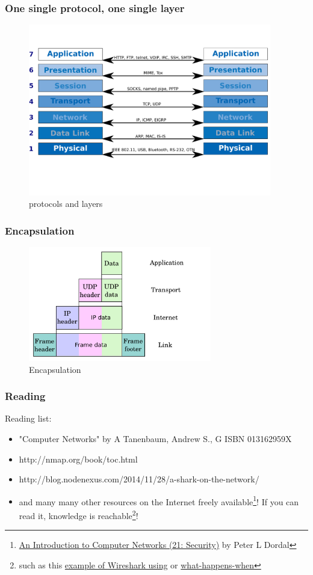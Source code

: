   \begin{frame}
    \frametitle{One single protocol, one single layer}
    \begin{figure}[t]
      \centering
      \includegraphics[height=7.5cm]{./imgs/layer2protocol.pdf}
      \caption{protocols and layers}
      \label{fig:layers2proto}
    \end{figure}
  \end{frame}
  \begin{frame}
    \frametitle{Encapsulation}
    \begin{figure}[t]
      \centering
      \includegraphics[height=5cm]{./imgs/encapsulation.pdf}
      \caption{Encapsulation}
      \label{fig:encapsulation}
    \end{figure}
  \end{frame}

  \begin{frame}
    \frametitle{Reading}
    \begin{block}{Reading list:}
      \begin{itemize}
        \item "Computer Networks" by A Tanenbaum, Andrew S., G ISBN 013162959X
        \item http://nmap.org/book/toc.html
        \item http://blog.nodenexus.com/2014/11/28/a-shark-on-the-network/
        \item and many many other resources on the Internet freely available\footnote{{\color{blue}\href{http://intronetworks.cs.luc.edu/current/ComputerNetworks.pdf}{An Introduction to Computer Networks (21: Security)}} by Peter L Dordal}! If you can read it, knowledge is reachable\footnote{such as this {\color{blue}\href{https://silverskylabs.github.io/yakhak/}{example of Wireshark using}} or {\color{blue}\href{https://github.com/alex/what-happens-when}{what-happens-when}}}!
      \end{itemize}
    \end{block}
  \end{frame}

